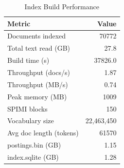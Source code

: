 \begin{table}[h]
\centering
\caption{Index Build Performance}
\label{tab:build-perf}
\begin{tabular}{lr}
\toprule
Metric & Value \\
\midrule
Documents indexed & 70772 \\
Total text read (GB) & 27.8 \\
Build time (s) & 37826.0 \\
Throughput (docs/s) & 1.87 \\
Throughput (MB/s) & 0.74 \\
Peak memory (MB) & 1009 \\
SPIMI blocks & 150 \\
Vocabulary size & 22{,}463{,}450 \\
Avg doc length (tokens) & 61570 \\
postings.bin (GB) & 1.15 \\
index.sqlite (GB) & 1.28 \\
\bottomrule
\end{tabular}
\end{table}
